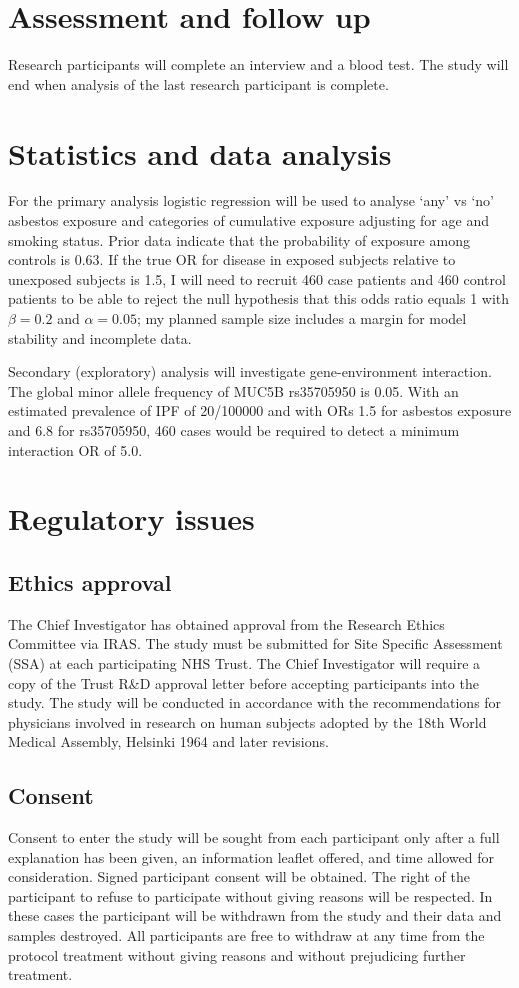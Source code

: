 \documentclass[a4paper,10pt]{article}
\begin{document}
\section{Assessment and follow up}
Research participants will complete an interview and a blood test. The study will end when analysis of the last research participant is complete.

\section{Statistics and data analysis}
For the primary analysis logistic regression will be used to analyse ‘any’ vs ‘no’ asbestos exposure and
categories of cumulative exposure adjusting for age and smoking status. Prior data indicate that the probability of
exposure among controls is 0.63. If the true OR for disease in exposed subjects relative to unexposed subjects is 1.5,
I will need to recruit 460 case patients and 460 control patients to be able to reject the null hypothesis that this odds
ratio equals 1 with \ensuremath{\beta = 0.2} and \ensuremath{\alpha = 0.05}; my planned sample size includes a margin for model stability
and incomplete data.

Secondary (exploratory) analysis will investigate gene-environment interaction. The global minor allele frequency of
MUC5B rs35705950 is 0.05. With an estimated prevalence of IPF of 20/100000 and with ORs 1.5 for asbestos exposure 
and 6.8 for rs35705950, 460 cases would be required to detect a minimum interaction OR of 5.0.

\section{Regulatory issues}

\subsection{Ethics approval}
The Chief Investigator has obtained approval from the Research Ethics Committee via IRAS\@. The study must be submitted for Site Specific Assessment (SSA) at each participating NHS Trust. The Chief Investigator will require a copy of the Trust R\&D approval letter before accepting participants into the study. The study will be conducted in accordance with the recommendations for physicians involved in research on human subjects adopted by the 18th World Medical Assembly, Helsinki 1964 and later revisions.


\subsection{Consent}
Consent to enter the study will be sought from each participant only after a full explanation has been given, an information leaflet offered, and time allowed for consideration. Signed participant consent will be obtained. The right of the participant to refuse to participate without giving reasons will be respected. In these cases the participant will be withdrawn from the study and their data and samples destroyed. All participants are free to withdraw at any time from the protocol treatment without giving reasons and without prejudicing further treatment.
\end{document}
